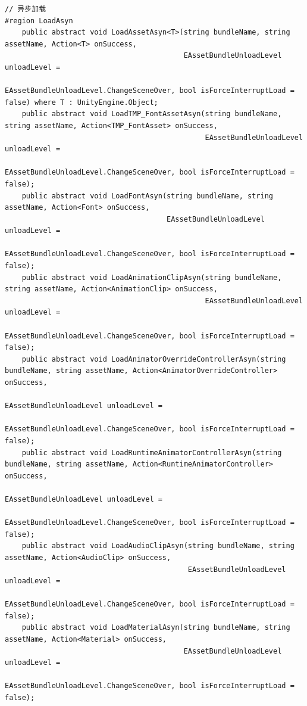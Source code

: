 \documentclass[9pt, b5paper]{article}
\begin{document}
\begin{itemize}
\begin{verbatim}
// 异步加载
#region LoadAsyn
    public abstract void LoadAssetAsyn<T>(string bundleName, string assetName, Action<T> onSuccess, 
                                          EAssetBundleUnloadLevel unloadLevel = 
                                          EAssetBundleUnloadLevel.ChangeSceneOver, bool isForceInterruptLoad = false) where T : UnityEngine.Object;
    public abstract void LoadTMP_FontAssetAsyn(string bundleName, string assetName, Action<TMP_FontAsset> onSuccess, 
                                               EAssetBundleUnloadLevel unloadLevel = 
                                               EAssetBundleUnloadLevel.ChangeSceneOver, bool isForceInterruptLoad = false);
    public abstract void LoadFontAsyn(string bundleName, string assetName, Action<Font> onSuccess, 
                                      EAssetBundleUnloadLevel unloadLevel = 
                                      EAssetBundleUnloadLevel.ChangeSceneOver, bool isForceInterruptLoad = false);
    public abstract void LoadAnimationClipAsyn(string bundleName, string assetName, Action<AnimationClip> onSuccess, 
                                               EAssetBundleUnloadLevel unloadLevel = 
                                               EAssetBundleUnloadLevel.ChangeSceneOver, bool isForceInterruptLoad = false);
    public abstract void LoadAnimatorOverrideControllerAsyn(string bundleName, string assetName, Action<AnimatorOverrideController> onSuccess, 
                                                            EAssetBundleUnloadLevel unloadLevel = 
                                                            EAssetBundleUnloadLevel.ChangeSceneOver, bool isForceInterruptLoad = false);
    public abstract void LoadRuntimeAnimatorControllerAsyn(string bundleName, string assetName, Action<RuntimeAnimatorController> onSuccess, 
                                                           EAssetBundleUnloadLevel unloadLevel = 
                                                           EAssetBundleUnloadLevel.ChangeSceneOver, bool isForceInterruptLoad = false);
    public abstract void LoadAudioClipAsyn(string bundleName, string assetName, Action<AudioClip> onSuccess, 
                                           EAssetBundleUnloadLevel unloadLevel = 
                                           EAssetBundleUnloadLevel.ChangeSceneOver, bool isForceInterruptLoad = false);
    public abstract void LoadMaterialAsyn(string bundleName, string assetName, Action<Material> onSuccess, 
                                          EAssetBundleUnloadLevel unloadLevel = 
                                          EAssetBundleUnloadLevel.ChangeSceneOver, bool isForceInterruptLoad = false);

\end{verbatim}
\end{itemize}
\end{document}
